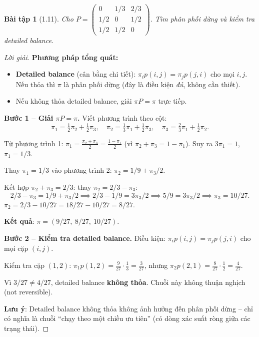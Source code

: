 \documentclass[8pt,a4paper]{article}
\newtheorem{exercise}{Bài tập}
\newenvironment{solution}{\begin{proof}[Lời giải]}{\end{proof}}
\begin{document}
\begin{exercise}[1.11]
Cho $P = \begin{pmatrix} 0 & 1/3 & 2/3 \\ 1/2 & 0 & 1/2 \\ 1/2 & 1/2 & 0 \end{pmatrix}$. Tìm phân phối dừng và kiểm tra detailed balance.
\end{exercise}
\begin{solution}
\textbf{Phương pháp tổng quát:}
\begin{itemize}
  \item \textbf{Detailed balance} (cân bằng chi tiết): $\pi_i p(i,j) = \pi_j p(j,i)$ cho mọi $i,j$. Nếu thỏa thì $\pi$ là phân phối dừng (đây là điều kiện \emph{đủ}, không cần thiết).
  \item Nếu không thỏa detailed balance, giải $\pi P = \pi$ trực tiếp.
\end{itemize}

\textbf{Bước 1 -- Giải $\pi P = \pi$.}
Viết phương trình theo cột:
\[
  \pi_1 = \tfrac{1}{2}\pi_2 + \tfrac{1}{2}\pi_3, \quad \pi_2 = \tfrac{1}{3}\pi_1 + \tfrac{1}{2}\pi_3, \quad \pi_3 = \tfrac{2}{3}\pi_1 + \tfrac{1}{2}\pi_2.
\]

Từ phương trình 1: $\pi_1 = \frac{\pi_2 + \pi_3}{2} = \frac{1 - \pi_1}{2}$ (vì $\pi_2 + \pi_3 = 1 - \pi_1$). Suy ra $3\pi_1 = 1$, $\pi_1 = 1/3$.

Thay $\pi_1 = 1/3$ vào phương trình 2: $\pi_2 = 1/9 + \pi_3/2$.

Kết hợp $\pi_2 + \pi_3 = 2/3$: thay $\pi_2 = 2/3 - \pi_3$:
\[
  2/3 - \pi_3 = 1/9 + \pi_3/2 \implies 2/3 - 1/9 = 3\pi_3/2 \implies 5/9 = 3\pi_3/2 \implies \pi_3 = 10/27.
\]
$\pi_2 = 2/3 - 10/27 = 18/27 - 10/27 = 8/27$.

\textbf{Kết quả}: $\pi = (9/27,\ 8/27,\ 10/27)$.

\textbf{Bước 2 -- Kiểm tra detailed balance.}
Điều kiện: $\pi_i p(i,j) = \pi_j p(j,i)$ cho mọi cặp $(i,j)$.

Kiểm tra cặp $(1,2)$: $\pi_1 p(1,2) = \frac{9}{27} \cdot \frac{1}{3} = \frac{3}{27}$, nhưng $\pi_2 p(2,1) = \frac{8}{27} \cdot \frac{1}{2} = \frac{4}{27}$.

Vì $3/27 \neq 4/27$, detailed balance \textbf{không thỏa}. Chuỗi này không thuận nghịch (not reversible).

\textbf{Lưu ý}: Detailed balance không thỏa không ảnh hưởng đến phân phối dừng -- chỉ có nghĩa là chuỗi ``chạy theo một chiều ưu tiên'' (có dòng xác suất ròng giữa các trạng thái).
\end{solution}
\end{document}
